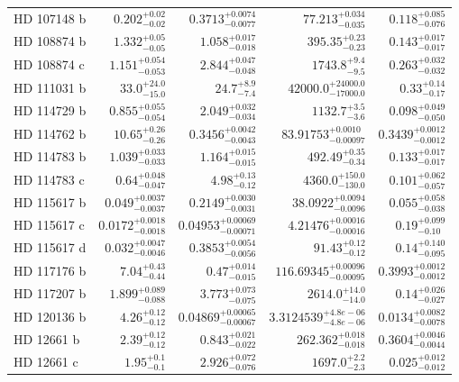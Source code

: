 \begin{longtable*}{lrrrr}
HD 107148 b & $0.202^{+0.02}_{-0.02}$ & $0.3713^{+0.0074}_{-0.0077}$ & $77.213^{+0.034}_{-0.035}$ & $0.118^{+0.085}_{-0.076}$ \\ 
HD 108874 b & $1.332^{+0.05}_{-0.05}$ & $1.058^{+0.017}_{-0.018}$ & $395.35^{+0.23}_{-0.23}$ & $0.143^{+0.017}_{-0.017}$ \\ 
HD 108874 c & $1.151^{+0.054}_{-0.053}$ & $2.844^{+0.047}_{-0.048}$ & $1743.8^{+9.4}_{-9.5}$ & $0.263^{+0.032}_{-0.032}$ \\ 
HD 111031 b & $33.0^{+24.0}_{-15.0}$ & $24.7^{+8.9}_{-7.4}$ & $42000.0^{+24000.0}_{-17000.0}$ & $0.33^{+0.14}_{-0.17}$ \\ 
HD 114729 b & $0.855^{+0.055}_{-0.054}$ & $2.049^{+0.032}_{-0.034}$ & $1132.7^{+3.5}_{-3.6}$ & $0.098^{+0.049}_{-0.050}$ \\ 
HD 114762 b & $10.65^{+0.26}_{-0.26}$ & $0.3456^{+0.0042}_{-0.0043}$ & $83.91753^{+0.0010}_{-0.00097}$ & $0.3439^{+0.0012}_{-0.0012}$ \\ 
HD 114783 b & $1.039^{+0.033}_{-0.033}$ & $1.164^{+0.015}_{-0.015}$ & $492.49^{+0.35}_{-0.34}$ & $0.133^{+0.017}_{-0.017}$ \\ 
HD 114783 c & $0.64^{+0.048}_{-0.047}$ & $4.98^{+0.13}_{-0.12}$ & $4360.0^{+150.0}_{-130.0}$ & $0.101^{+0.062}_{-0.057}$ \\ 
HD 115617 b & $0.049^{+0.0037}_{-0.0037}$ & $0.2149^{+0.0030}_{-0.0031}$ & $38.0922^{+0.0094}_{-0.0096}$ & $0.055^{+0.058}_{-0.038}$ \\ 
HD 115617 c & $0.0172^{+0.0018}_{-0.0018}$ & $0.04953^{+0.00069}_{-0.00071}$ & $4.21476^{+0.00016}_{-0.00016}$ & $0.19^{+0.099}_{-0.10}$ \\ 
HD 115617 d & $0.032^{+0.0047}_{-0.0046}$ & $0.3853^{+0.0054}_{-0.0056}$ & $91.43^{+0.12}_{-0.12}$ & $0.14^{+0.140}_{-0.095}$ \\ 
HD 117176 b & $7.04^{+0.43}_{-0.44}$ & $0.47^{+0.014}_{-0.015}$ & $116.69345^{+0.00096}_{-0.00095}$ & $0.3993^{+0.0012}_{-0.0012}$ \\ 
HD 117207 b & $1.899^{+0.089}_{-0.088}$ & $3.773^{+0.073}_{-0.075}$ & $2614.0^{+14.0}_{-14.0}$ & $0.14^{+0.026}_{-0.027}$ \\ 
HD 120136 b & $4.26^{+0.12}_{-0.12}$ & $0.04869^{+0.00065}_{-0.00067}$ & $3.3124539^{+4.8e-06}_{-4.8e-06}$ & $0.0134^{+0.0082}_{-0.0078}$ \\ 
HD 12661 b & $2.39^{+0.12}_{-0.12}$ & $0.843^{+0.021}_{-0.022}$ & $262.362^{+0.018}_{-0.018}$ & $0.3604^{+0.0046}_{-0.0044}$ \\ 
HD 12661 c & $1.95^{+0.1}_{-0.1}$ & $2.926^{+0.072}_{-0.076}$ & $1697.0^{+2.2}_{-2.3}$ & $0.025^{+0.012}_{-0.012}$ \\ 

\end{longtable*}
